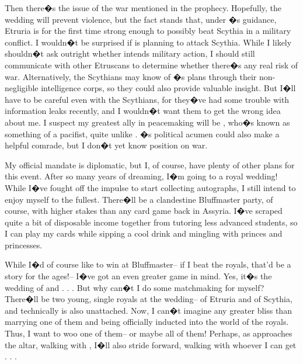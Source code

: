 \documentclass[char]{Kos}
\begin{document}
Then there�s the issue of the war mentioned in the prophecy. Hopefully, the wedding will prevent violence, but the fact stands that, under \cEtruriaKing{\nickname}�s guidance, Etruria is for the first time strong enough to possibly beat Scythia in a military conflict. I wouldn�t be surprised if \cEtruriaKing{\nickname} is planning to attack Scythia. While I likely shouldn�t ask \cEtruriaKing{\them} outright whether \cEtruriaKing{\they} intends military action, I should still communicate with other Etruscans to determine whether there�s any real risk of war. Alternatively, the Scythians may know of \cEtruriaKing{\nickname}�s plans through their non-negligible intelligence corps, so they could also provide valuable insight. But I�ll have to be careful even with the Scythians, for they�ve had some trouble with information leaks recently, and I wouldn�t want them to get the wrong idea about me. I suspect my greatest ally in peacemaking will be \cGroom{\Prince} \cGroom{\nickname}, who�s known as something of a pacifist, quite unlike \cGroom{\their} \cEtruriaKing{\parent}. \cBride{\nickname}�s political acumen could also make \cBride{\them} a helpful comrade, but I don�t yet know \cBride{\their} position on war.

My official mandate is diplomatic, but I, of course, have plenty of other plans for this event. After so many years of dreaming, I�m going to a royal wedding! While I�ve fought off the impulse to start collecting autographs, I still intend to enjoy myself to the fullest. There�ll be a clandestine Bluffmaster party, of course, with higher stakes than any card game back in Assyria. I�ve scraped quite a bit of disposable income together from tutoring less advanced students, so I can play my cards while sipping a cool drink and mingling with princes and princesses.

While I�d of course like to win at Bluffmaster-- if I beat the royals, that'd be a story for the ages!-- I�ve got an even greater game in mind. Yes, it�s the wedding of \cBride{\nickname} and \cGroom{\nickname} . . . But why can�t I do some matchmaking for myself? There�ll be two young, single royals at the wedding-- \cPoet{\nickname} of Etruria and \cWard{\nickname} of Scythia, and technically \cEtruriaKing{\nickname} is also unattached. Now, I can�t imagine any greater bliss than marrying one of them and being officially inducted into the world of the royals. Thus, I want to woo one of them-- or maybe all of them! Perhaps, as \cBride{\nickname} approaches the altar, walking with \cGroom{\nickname}, I�ll also stride forward, walking with whoever I can get . . .
\end{document}
